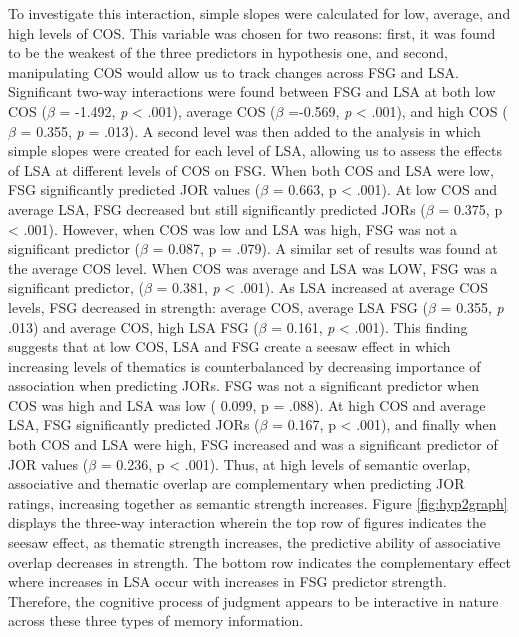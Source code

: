 \documentclass[english,man]{apa6}
\theoremstyle{definition}
\theoremstyle{definition}
\theoremstyle{definition}
\theoremstyle{remark}
\begin{document}
To investigate this interaction, simple slopes were calculated for low,
average, and high levels of COS. This variable was chosen for two
reasons: first, it was found to be the weakest of the three predictors
in hypothesis one, and second, manipulating COS would allow us to track
changes across FSG and LSA. Significant two-way interactions were found
between FSG and LSA at both low COS (\(\beta\) = -1.492, \emph{p}
\textless{} .001), average COS (\(\beta\) =-0.569, \emph{p} \textless{}
.001), and high COS (\(\beta\) = 0.355, \emph{p} = .013). A second level
was then added to the analysis in which simple slopes were created for
each level of LSA, allowing us to assess the effects of LSA at different
levels of COS on FSG. When both COS and LSA were low, FSG significantly
predicted JOR values (\(\beta\) = 0.663, p \textless{} .001). At low COS
and average LSA, FSG decreased but still significantly predicted JORs
(\(\beta\) = 0.375, p \textless{} .001). However, when COS was low and
LSA was high, FSG was not a significant predictor (\(\beta\) = 0.087, p
= .079). A similar set of results was found at the average COS level.
When COS was average and LSA was LOW, FSG was a significant predictor,
(\(\beta\) = 0.381, \emph{p} \textless{} .001). As LSA increased at
average COS levels, FSG decreased in strength: average COS, average LSA
FSG (\(\beta\) = 0.355, \emph{p} .013) and average COS, high LSA FSG
(\(\beta\) = 0.161, \emph{p} \textless{} .001). This finding suggests
that at low COS, LSA and FSG create a seesaw effect in which increasing
levels of thematics is counterbalanced by decreasing importance of
association when predicting JORs. FSG was not a significant predictor
when COS was high and LSA was low ( 0.099, p = .088). At high COS and
average LSA, FSG significantly predicted JORs (\(\beta\) = 0.167, p
\textless{} .001), and finally when both COS and LSA were high, FSG
increased and was a significant predictor of JOR values (\(\beta\) =
0.236, p \textless{} .001). Thus, at high levels of semantic overlap,
associative and thematic overlap are complementary when predicting JOR
ratings, increasing together as semantic strength increases. Figure
\ref{fig:hyp2graph} displays the three-way interaction wherein the top
row of figures indicates the seesaw effect, as thematic strength
increases, the predictive ability of associative overlap decreases in
strength. The bottom row indicates the complementary effect where
increases in LSA occur with increases in FSG predictor strength.
Therefore, the cognitive process of judgment appears to be interactive
in nature across these three types of memory information.
\end{document}

